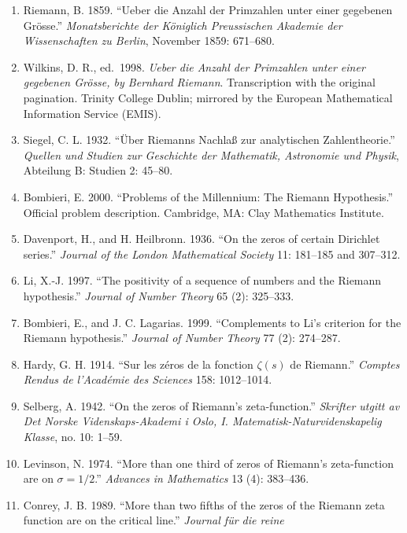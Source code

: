 \documentclass[10pt]{article}
\providecommand{\tightlist}{\setlength{\itemsep}{0pt}\setlength{\parskip}{0pt}}
\newenvironment{refsblock}{\par\small}{\par}
\begin{document}
\begin{refsblock}

\begin{enumerate}
\def\labelenumi{\arabic{enumi}.}
\tightlist
\item
  Riemann, B. 1859. ``Ueber die Anzahl der Primzahlen unter einer
  gegebenen Grösse.'' \emph{Monatsberichte der Königlich Preussischen
  Akademie der Wissenschaften zu Berlin}, November 1859: 671--680.
\item
  Wilkins, D. R., ed.~1998. \emph{Ueber die Anzahl der Primzahlen unter
  einer gegebenen Grösse, by Bernhard Riemann}. Transcription with the
  original pagination. Trinity College Dublin; mirrored by the European
  Mathematical Information Service (EMIS).
\item
  Siegel, C. L. 1932. ``Über Riemanns Nachlaß zur analytischen
  Zahlentheorie.'' \emph{Quellen und Studien zur Geschichte der
  Mathematik, Astronomie und Physik}, Abteilung B: Studien 2: 45--80.
\item
  Bombieri, E. 2000. ``Problems of the Millennium: The Riemann
  Hypothesis.'' Official problem description. Cambridge, MA: Clay
  Mathematics Institute.
\item
  Davenport, H., and H. Heilbronn. 1936. ``On the zeros of certain
  Dirichlet series.'' \emph{Journal of the London Mathematical Society}
  11: 181--185 and 307--312.
\item
  Li, X.-J. 1997. ``The positivity of a sequence of numbers and the
  Riemann hypothesis.'' \emph{Journal of Number Theory} 65 (2):
  325--333.
\item
  Bombieri, E., and J. C. Lagarias. 1999. ``Complements to Li's
  criterion for the Riemann hypothesis.'' \emph{Journal of Number
  Theory} 77 (2): 274--287.
\item
  Hardy, G. H. 1914. ``Sur les zéros de la fonction \(\zeta(s)\) de
  Riemann.'' \emph{Comptes Rendus de l'Académie des Sciences} 158:
  1012--1014.
\item
  Selberg, A. 1942. ``On the zeros of Riemann's zeta-function.''
  \emph{Skrifter utgitt av Det Norske Videnskaps-Akademi i Oslo, I.
  Matematisk-Naturvidenskapelig Klasse}, no. 10: 1--59.
\item
  Levinson, N. 1974. ``More than one third of zeros of Riemann's
  zeta-function are on \(\sigma = 1/2\).'' \emph{Advances in
  Mathematics} 13 (4): 383--436.
\item
  Conrey, J. B. 1989. ``More than two fifths of the zeros of the Riemann
  zeta function are on the critical line.'' \emph{Journal für die reine
}
\end{enumerate}
\end{refsblock}
\end{document}
